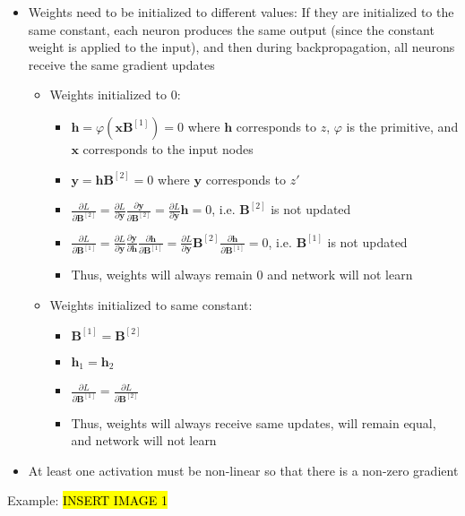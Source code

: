 \begin{itemize}
    \item Weights need to be initialized to different values: If they are initialized to the same constant, each neuron produces the same output (since the constant weight is applied to the input), and then during backpropagation, all neurons receive the same gradient updates
    \begin{itemize}
        \item Weights initialized to $0$:
        \begin{itemize}
            \item $\boldsymbol{h} = \varphi\left( \boldsymbol{x} \boldsymbol{B}^{[1]}\right) = 0$ where $\boldsymbol{h}$ corresponds to $z$, $\varphi$ is the primitive, and $\boldsymbol{x}$ corresponds to the input nodes 
            \item $\boldsymbol{y} = \boldsymbol{h} \boldsymbol{B}^{[2]} = 0$ where $\boldsymbol{y}$ corresponds to $z'$
            \item $\frac{\partial L}{\partial \boldsymbol{B}^{[2]}} = \frac{\partial L}{\partial \boldsymbol{y}} \frac{\partial \boldsymbol{y}}{\partial \boldsymbol{B}^{[2]}} = \frac{\partial L}{\partial \boldsymbol{y}} \boldsymbol{h} = 0$, i.e. $\boldsymbol{B}^{[2]}$ is not updated
            \item $\frac{\partial L}{\partial \boldsymbol{B}^{[1]}} = \frac{\partial L}{\partial \boldsymbol{y}} \frac{\partial \boldsymbol{y}}{\partial \boldsymbol{h}} \frac{\partial \boldsymbol{h}}{\partial \boldsymbol{B}^{[1]}} = \frac{\partial L}{\partial \boldsymbol{y}} \boldsymbol{B}^{[2]} \frac{\partial \boldsymbol{h}}{\partial \boldsymbol{B}^{[1]}} = 0$, i.e. $\boldsymbol{B}^{[1]}$ is not updated
            \item Thus, weights will always remain $0$ and network will not learn
        \end{itemize}
        \item Weights initialized to same constant:
        \begin{itemize}
            \item $\boldsymbol{B}^{[1]} = \boldsymbol{B}^{[2]}$
            \item $\boldsymbol{h}_1 = \boldsymbol{h}_2$
            \item $\frac{\partial L}{\partial \boldsymbol{B}^{[1]}} = \frac{\partial L}{\partial \boldsymbol{B}^{[2]}}$
            \item Thus, weights will always receive same updates, will remain equal, and network will not learn
        \end{itemize}
    \end{itemize}
    \item At least one activation must be non-linear so that there is a non-zero gradient
\end{itemize}
Example:
\hl{INSERT IMAGE 1}